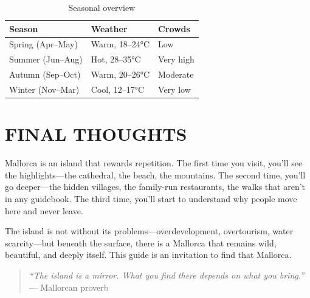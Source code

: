 \documentclass[
    language=english,
    doctype=travel-guide,
    institution=none,
]{../../omnilatex}
\begin{document}
\begin{table}[h]
\centering
\begin{tabular}{p{3cm}p{4cm}p{4cm}}
\toprule
\textbf{Season} & \textbf{Weather} & \textbf{Crowds} \\
\midrule
Spring (Apr--May) & Warm, 18--24°C & Low \\
Summer (Jun--Aug) & Hot, 28--35°C & Very high \\
Autumn (Sep--Oct) & Warm, 20--26°C & Moderate \\
Winter (Nov--Mar) & Cool, 12--17°C & Very low \\
\bottomrule
\end{tabular}
\caption{Seasonal overview}
\end{table}

\section*{FINAL THOUGHTS}

Mallorca is an island that rewards repetition. The first time you visit, you'll see the highlights---the cathedral, the beach, the mountains. The second time, you'll go deeper---the hidden villages, the family-run restaurants, the walks that aren't in any guidebook. The third time, you'll start to understand why people move here and never leave.

The island is not without its problems---overdevelopment, overtourism, water scarcity---but beneath the surface, there is a Mallorca that remains wild, beautiful, and deeply itself. This guide is an invitation to find that Mallorca.

\begin{quote}
\textit{``The island is a mirror. What you find there depends on what you bring.''}\\
--- Mallorcan proverb
\end{quote}
\end{document}
